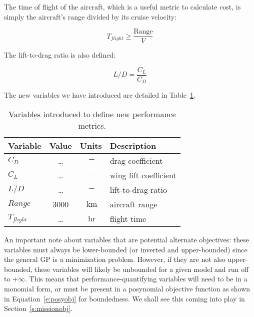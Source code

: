 The time of flight of the aircraft, which is a useful metric to calculate cost,
is simply the aircraft's range divided by its cruise velocity:

\begin{equation}
    T_{flight} \geq \frac{\mathrm{Range}}{V}
\end{equation}

The lift-to-drag ratio is also defined: 

\begin{equation}
    L/D = \frac{C_L}{C_D}    
\end{equation}

The new variables we have introduced are detailed in Table~\ref{t:vars_perfMetrics}.

\begin{footnotesize}
\begin{table}
    \centering
    \begin{tabular}{ l c c l}
        \toprule
        \textbf{Variable} & \textbf{Value} & \textbf{Units} & \textbf{Description} \\
        \midrule
        $C_D$ & \ldots & $~\mathrm{-}$ & drag coefficient \\
        $C_L$ & \ldots & $~\mathrm{-}$ & wing lift coefficient \\
        $L/D$ & \ldots & $~\mathrm{-}$ & lift-to-drag ratio \\
        $Range$ & 3000 & $~\mathrm{km}$ & aircraft range \\
        $T_{flight}$ & \ldots & $~\mathrm{hr}$ & flight time \\
        \bottomrule
    \end{tabular}
    \caption{Variables introduced to define new performance metrics.}
    \label{t:vars_perfMetrics}
\end{table} \end{footnotesize}

An important note about variables that are potential alternate objectives: these variables
must always be lower-bounded (or inverted and upper-bounded) since the general \gls{GP} is a
minimization problem. However, if they are not also upper-bounded, these variables
will likely be unbounded for a given model and run off to +$\infty$. This means that
performance-quantifying variables will need to be in a monomial form,
or must be present in a posynomial objective
function as shown in Equation~\ref{e:posyobj} for boundedness. We shall see this coming into play
in Section~\ref{s:missionobj}.

